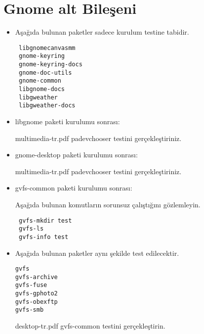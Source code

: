 \documentclass[a4paper,10pt]{article}
\begin{document}
\section{Gnome alt Bileşeni}
\begin{itemize}
 \item Aşağıda bulunan paketler sadece kurulum testine tabidir.
\begin{verbatim}
 libgnomecanvasmm
 gnome-keyring
 gnome-keyring-docs
 gnome-doc-utils
 gnome-common
 libgnome-docs
 libgweather
 libgweather-docs
\end{verbatim}

\item libgnome paketi kurulumu sonrası:

multimedia-tr.pdf padevchooser testini gerçekleştiriniz.


\item gnome-desktop paketi kurulumu sonrası:

multimedia-tr.pdf padevchooser testini gerçekleştiriniz.

\item gvfs-common paketi kurulumu sonrası:

Aşağıda bulunan komutların sorunsuz çalıştığını gözlemleyin.
\begin{verbatim}
 gvfs-mkdir test
 gvfs-ls
 gvfs-info test
\end{verbatim}


\item Aşağıda bulunan paketler aynı şekilde test edilecektir.

\begin{verbatim}
gvfs
gvfs-archive
gvfs-fuse
gvfs-gphoto2
gvfs-obexftp
gvfs-smb
\end{verbatim}

desktop-tr.pdf gvfs-common testini gerçekleştirin.
\end{itemize}
\end{document}
